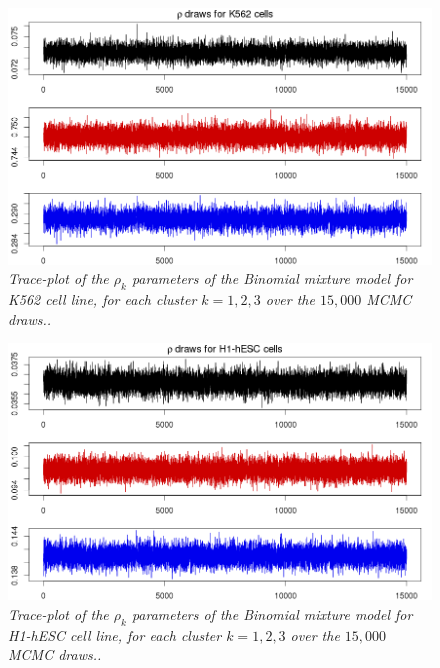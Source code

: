 \begin{figure}[!ht]
\begin{center}
 \includegraphics[scale = 0.46]{images/bccMV2DBinomk562}
\caption{\emph{Trace-plot of the $\rho_{k}$ parameters of the Binomial mixture model for K562 cell line, for each cluster $k=1,2,3$ over the $15,000$ MCMC draws..}}
\label{mix-bin-pic}
\end{center}
\end{figure}

\begin{figure}[!ht]
\begin{center}
 \includegraphics[scale = 0.46]{images/bccMV2DBinomh1}
\caption{\emph{Trace-plot of the $\rho_{k}$ parameters of the Binomial mixture model for H1-hESC cell line, for each cluster $k=1,2,3$ over the $15,000$ MCMC draws..}}
\label{mix-bin2-pic}
\end{center}
\end{figure}